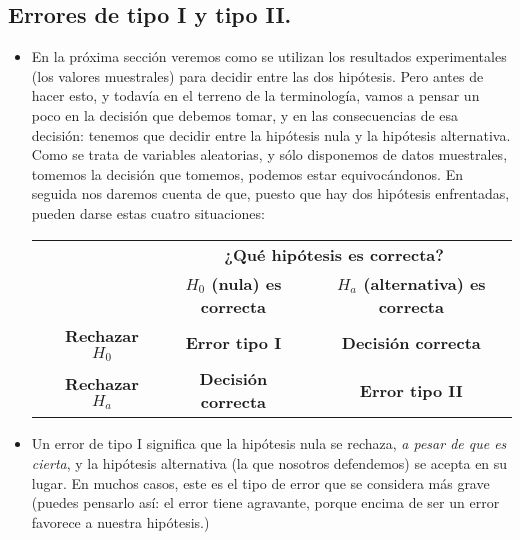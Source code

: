     \subsection*{Errores de tipo I y tipo II.}



    \begin{itemize}

    \item En la próxima sección veremos como se utilizan los resultados experimentales (los valores muestrales) para decidir entre las dos hipótesis. Pero antes de hacer esto, y todavía en el terreno de la terminología, vamos a pensar un poco en la decisión que debemos tomar, y en las consecuencias de esa decisión: tenemos que decidir entre la hipótesis nula y la hipótesis alternativa. Como se trata de variables aleatorias, y sólo disponemos de datos muestrales, tomemos la decisión que tomemos, podemos estar equivocándonos. En seguida nos daremos cuenta de que, puesto que hay dos hipótesis enfrentadas, pueden darse estas cuatro situaciones:
        \begin{center}
        \begin{tabular}{cccc}
        \cline{3-4}
        &&\multicolumn{2}{|c|}{\bf ¿Qué hipótesis es correcta?}\\[3mm]
        \cline{3-4}
                                                      &&\multicolumn{1}{|c|}{\bf $H_0$ (nula) es correcta}&\multicolumn{1}{|c|}{\bf $H_a$ (alternativa) es correcta}\\[3mm]
        \cline{2-4}
                                        &\multicolumn{1}{|c|}{\bf Rechazar $H_0$}&\multicolumn{1}{|c|}{\bf Error tipo I}&\multicolumn{1}{|c|}{\bf Decisión correcta}\\[3mm]
        \cline{2-4}
                                        &\multicolumn{1}{|c|}{\bf Rechazar $H_a$}&\multicolumn{1}{|c|}{\bf Decisión correcta}&\multicolumn{1}{|c|}{\bf Error tipo II}\\[3mm]
        \cline{2-4}
        \end{tabular}
        \end{center}
        \item Un {\sf error de tipo I} significa que la hipótesis nula se rechaza, {\em a pesar de que es cierta}, y la hipótesis alternativa (la que nosotros defendemos) se acepta en su lugar. En  muchos casos, este es el tipo de error que se considera más grave (puedes pensarlo así: el error tiene agravante, porque encima de ser un error favorece a nuestra hipótesis.)


\end{itemize}
